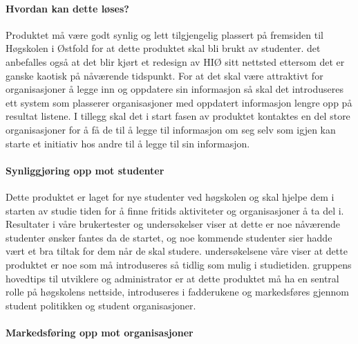 
\paragraph{Hvordan kan dette løses?}

Produktet må være godt synlig og lett tilgjengelig plassert på fremsiden til Høgskolen i Østfold for at dette produktet skal bli brukt av studenter. det anbefalles også at det blir kjørt et redesign av HIØ sitt nettsted ettersom det er ganske kaotisk på nåværende tidspunkt. For at det skal være attraktivt for organisasjoner å legge inn og oppdatere sin informasjon så skal det introduseres ett system som plasserer organisasjoner med oppdatert informasjon lengre opp på resultat listene. I tillegg skal det i start fasen av produktet kontaktes en del store organisasjoner for å få de til å legge til informasjon om seg selv som igjen kan starte et initiativ hos andre til å legge til sin informasjon. 


\paragraph{Synliggjøring opp mot studenter}

Dette produktet er laget for nye studenter ved høgskolen og skal hjelpe dem i starten av studie tiden for å finne fritids aktiviteter og organisasjoner å ta del i. Resultater i våre brukertester og undersøkelser viser at dette er noe nåværende studenter ønsker fantes da de startet, og noe kommende studenter sier hadde vært et bra tiltak for dem når de skal studere. 
undersøkelsene våre viser at dette produktet er noe som må introduseres så tidlig som mulig i studietiden. gruppens hovedtips til utviklere og administrator er at dette produktet må ha en sentral rolle på høgskolens nettside, introduseres i fadderukene og markedsføres gjennom student politikken og student organisasjoner.

\paragraph{Markedsføring opp mot organisasjoner}

